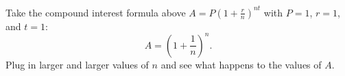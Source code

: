 \documentclass{ximera}
\begin{document}
\begin{question}
	Take the compound interest formula above $\displaystyle A = P\left( 1 + \frac{r}{n}\right)^{nt}$ with $P = 1$, $r = 1$, and $t = 1$:
	\[ A = \left( 1 + \frac{1}{n} \right)^{n}. \]
	Plug in larger and larger values of $n$ and see what happens to the values of $A$.
	\begin{multipleChoice}
	\end{multipleChoice}
\end{question}
\end{document}
